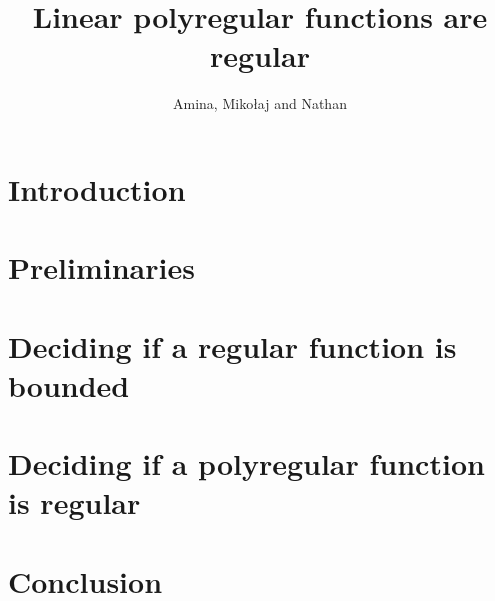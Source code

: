 \documentclass{article}
\begin{document}
 \title{Linear polyregular functions are regular}
 \author{Amina, Miko\l aj and Nathan}
 \maketitle



\section{Introduction}

\section{Preliminaries}

\section{Deciding if a regular function is bounded}

\section{Deciding if a polyregular function is regular}

\section{Conclusion}




\end{document}

